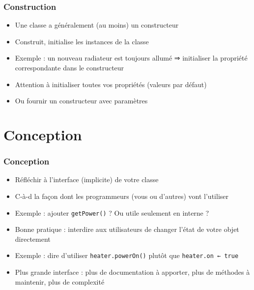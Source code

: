 \documentclass[english, french]{beamer}
\begin{document}
\begin{frame}
	\frametitle{Construction}
	\begin{itemize}
		\item Une classe a {\tiny généralement} (au moins) un constructeur
		\item Construit, initialise les instances de la classe
		\item Exemple : un nouveau radiateur est toujours allumé ⇒ initialiser la propriété correspondante dans le constructeur
		\item Attention à initialiser toutes vos propriétés (valeurs par défaut)
		\item Ou fournir un constructeur avec paramètres
	\end{itemize}
\end{frame}

\section{Conception}
\begin{frame}
	\frametitle{Conception}
	\begin{itemize}
		\item Réfléchir à l’interface (implicite) de votre classe
		\item C-à-d la façon dont les programmeurs (vous ou d’autres) vont l’utiliser
		\item Exemple : ajouter \texttt{getPower()} ? Ou utile seulement en interne ?
		\item Bonne pratique : interdire aux utilisateurs de changer l’état de votre objet directement
		\item Exemple : dire d’utiliser \texttt{heater.powerOn()} plutôt que \texttt{heater.on ← true}
		\item Plus grande interface : plus de documentation à apporter, plus de méthodes à maintenir, plus de complexité
	\end{itemize}
\end{frame}
\end{document}
